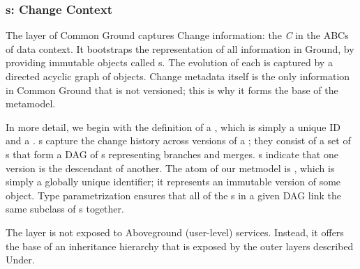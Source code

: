 \documentclass{sig-alternate}
\begin{document}

\subsubsection{{\Core}s: Change Context}

The \core layer of Common Ground captures Change information: the \emph{C} in the ABCs of data context. 
It bootstraps the representation of all information in Ground, by providing immutable objects called {\thing}s. 
The evolution of each \thing is captured by a directed acyclic graph of {\version} objects. Change metadata itself is the only information in Common Ground that is not versioned; this is why it forms the base of the metamodel.


In more detail, we begin with the definition of a \thing, which is simply a unique ID and a . 
s capture the change history across versions of a \thing; they consist of a set of s that form a DAG of {\version}s representing branches and merges.
s indicate that one version is the descendant of another.
The atom of our metmodel is \version, which is simply a globally unique identifier; it represents an immutable version of some object. 
Type parametrization ensures that all of the s in a given DAG link the same subclass of {\version}s together.

The \core layer is not exposed to Aboveground (user-level) services. 
Instead, it offers the base of an inheritance hierarchy that is exposed by the outer layers described Under.

\end{document}
